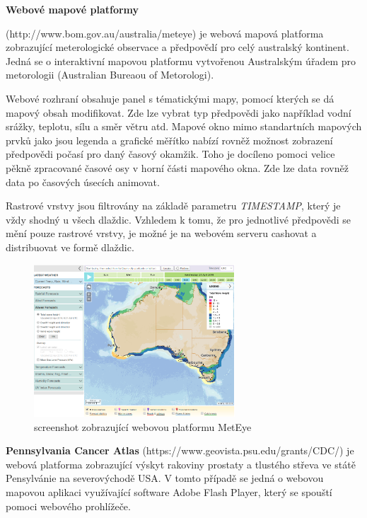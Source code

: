 \bigskip
\noindent \textbf{Webové mapové platformy}

(http://www.bom.gov.au/australia/meteye) je webová mapová platforma
zobrazující meterologické observace a předpovědí pro celý australský
kontinent. Jedná se o interaktivní mapovou platformu vytvořenou
Australským úřadem pro metorologii (Australian Bureaou of Metorologi).

Webové rozhraní obsahuje panel s tématickými mapy, pomocí kterých se
dá mapový obsah modifikovat. Zde lze vybrat typ předpovědi jako
například vodní srážky, teplotu, sílu a směr větru atd. Mapové okno
mimo standartních mapových prvků jako jsou legenda a grafické měřítko
nabízí rovněž možnost zobrazení předpovědi počasí pro daný časový
okamžik. Toho je docíleno pomoci velice pěkně zpracované časové osy v
horní části mapového okna. Zde lze data rovněž data po časových
úsecích animovat.

Rastrové vrstvy jsou filtrovány na základě parametru
\textit{TIMESTAMP}, který je vždy shodný u všech dlaždic. Vzhledem k
tomu, že pro jednotlivé předpovědi se mění pouze rastrové vrstvy, je
možné je na webovém serveru cashovat a distribuovat ve formě dlaždic.

\begin{figure}[h!]  \centering
\includegraphics[width=0.67\textwidth]{../img/meteye.png}
	\caption{screenshot zobrazující webovou platformu MetEye}
	\label{fig:gay-sands}
\end{figure}

\textbf{Pennsylvania Cancer Atlas}
(https://www.geovista.psu.edu/grants/CDC/) je webová platforma
zobrazující výskyt rakoviny prostaty a tlustého střeva ve státě
Pensylvánie na severovýchodě USA. V tomto případě se jedná o webovou
mapovou aplikaci využívající software Adobe Flash Player, který se
spouští pomoci webového prohlížeče.

